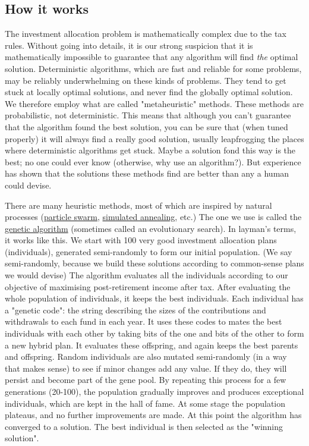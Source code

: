 \documentclass[a4paper, justified]{tufte-handout}
\begin{document}
\subsection{How it works}
The investment allocation problem is mathematically complex due to the tax rules. Without going into details, it is our strong suspicion that it is mathematically impossible to guarantee that any algorithm will find \textit{the} optimal solution. Deterministic algorithms, which are fast and reliable for some problems, may be reliably underwhelming on these kinds of problems. They tend to get stuck at locally optimal solutions, and never find the globally optimal solution. We therefore employ what are called "metaheuristic" methods. These methods are probabilistic, not deterministic. This means that although you can't guarantee that the algorithm found the best solution, you can be sure that (when tuned properly) it will always find a really good solution, usually leapfrogging the places where deterministic algorithms get stuck. Maybe a solution fond this way is the best; no one could ever know (otherwise, why use an algorithm?). But experience has shown that the solutions these methods find are better than any a human could devise.

There are many heuristic methods, most of which are inspired by natural processes (\href{https://en.wikipedia.org/wiki/Particle_swarm_optimization}{particle swarm}, \href{https://en.wikipedia.org/wiki/Simulated_annealing}{simulated annealing}, etc.) The one we use is called the \href{https://en.wikipedia.org/wiki/Genetic_algorithm}{genetic algorithm} (sometimes called an evolutionary search). In layman's terms, it works like this. We start with 100 very good investment allocation plans (individuals), generated semi-randomly to form our initial population. (We say semi-randomly, because we build these solutions according to common-sense plans we would devise) The algorithm evaluates all the individuals according to our objective of maximising post-retirement income after tax. After evaluating the whole population of individuals, it keeps the best individuals. Each individual has a "genetic code": the string describing the sizes of the contributions and withdrawals to each fund in each year. It uses these codes to mates the best individuals with each other by taking bits of the one and bits of the other to form a new hybrid plan. It evaluates these offspring, and again keeps the best parents and offspring. Random individuals are also mutated semi-randomly (in a way that makes sense) to see if minor changes add any value. If they do, they will persist and become part of the gene pool. By repeating this process for a few generations (20-100), the population gradually improves and produces exceptional individuals, which are kept in the hall of fame. At some stage the population plateaus, and no further improvements are made. At this point the algorithm has converged to a solution. The best individual is then selected as the "winning solution".
\end{document}
